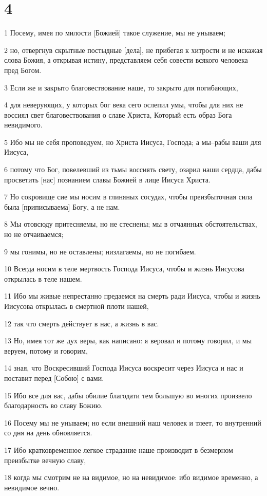 \chapter{4}

\par 1 Посему, имея по милости [Божией] такое служение, мы не унываем;
\par 2 но, отвергнув скрытные постыдные [дела], не прибегая к хитрости и не искажая слова Божия, а открывая истину, представляем себя совести всякого человека пред Богом.
\par 3 Если же и закрыто благовествование наше, то закрыто для погибающих,
\par 4 для неверующих, у которых бог века сего ослепил умы, чтобы для них не воссиял свет благовествования о славе Христа, Который есть образ Бога невидимого.
\par 5 Ибо мы не себя проповедуем, но Христа Иисуса, Господа; а мы--рабы ваши для Иисуса,
\par 6 потому что Бог, повелевший из тьмы воссиять свету, озарил наши сердца, дабы просветить [нас] познанием славы Божией в лице Иисуса Христа.
\par 7 Но сокровище сие мы носим в глиняных сосудах, чтобы преизбыточная сила была [приписываема] Богу, а не нам.
\par 8 Мы отовсюду притесняемы, но не стеснены; мы в отчаянных обстоятельствах, но не отчаиваемся;
\par 9 мы гонимы, но не оставлены; низлагаемы, но не погибаем.
\par 10 Всегда носим в теле мертвость Господа Иисуса, чтобы и жизнь Иисусова открылась в теле нашем.
\par 11 Ибо мы живые непрестанно предаемся на смерть ради Иисуса, чтобы и жизнь Иисусова открылась в смертной плоти нашей,
\par 12 так что смерть действует в нас, а жизнь в вас.
\par 13 Но, имея тот же дух веры, как написано: я веровал и потому говорил, и мы веруем, потому и говорим,
\par 14 зная, что Воскресивший Господа Иисуса воскресит через Иисуса и нас и поставит перед [Собою] с вами.
\par 15 Ибо все для вас, дабы обилие благодати тем большую во многих произвело благодарность во славу Божию.
\par 16 Посему мы не унываем; но если внешний наш человек и тлеет, то внутренний со дня на день обновляется.
\par 17 Ибо кратковременное легкое страдание наше производит в безмерном преизбытке вечную славу,
\par 18 когда мы смотрим не на видимое, но на невидимое: ибо видимое временно, а невидимое вечно.

